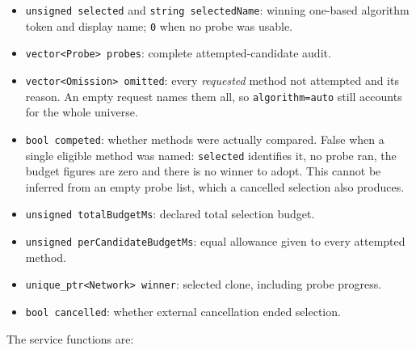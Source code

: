 \begin{itemize}
\item \texttt{unsigned selected} and \texttt{string selectedName}: winning
      one-based algorithm token and display name; \texttt{0} when no probe
      was usable.
\item \texttt{vector<Probe> probes}: complete attempted-candidate audit.
\item \texttt{vector<Omission> omitted}: every \emph{requested} method not
      attempted and its reason. An empty request names them all, so
      \texttt{algorithm=auto} still accounts for the whole universe.
\item \texttt{bool competed}: whether methods were actually compared. False
      when a single eligible method was named: \texttt{selected} identifies it,
      no probe ran, the budget figures are zero and there is no winner to adopt.
      This cannot be inferred from an empty probe list, which a cancelled
      selection also produces.
\item \texttt{unsigned totalBudgetMs}: declared total selection budget.
\item \texttt{unsigned perCandidateBudgetMs}: equal allowance given to every
      attempted method.
\item \texttt{unique\_ptr<Network> winner}: selected clone, including probe
      progress.
\item \texttt{bool cancelled}: whether external cancellation ended selection.
\end{itemize}

The service functions are:

